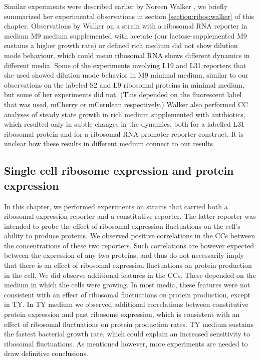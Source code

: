 Similar experiments were described earlier by Noreen Walker \cite{Walker2016t}, 
we briefly summarized her experimental observations in section \ref{section:ribos:walker} of this chapter.
%
Observations by Walker on a strain with a ribosomal RNA reporter in medium M9 medium supplemented with acetate (our lactose-supplemented M9 sustains a higher growth rate) or defined rich medium did not show dilution mode behaviour, which could mean ribosomal RNA shows different dynamics in different media.
%
Some of the experiments involving L19 and L31 reporters that she used showed dilution mode behavior in M9 minimal medium, similar to our observations on the labeled S2 and L9 ribosomal proteins in minimal medium, but some of her experiments did not. (This depended on the fluorescent label that was used, mCherry or mCerulean respectively.)
%
Walker also performed CC analyses of steady state growth in rich medium supplemented with antibiotics, which resulted only in subtle changes in the dynamics, both for a labelled L31 ribosomal protein and for a ribosomal RNA promoter reporter construct.
It is unclear how these results in different medium connect to our results.

\subsection{Single cell ribosome expression and protein expression}

In this chapter, we performed experiments on strains that carried both a ribosomal expression reporter and a constitutive reporter.
The latter reporter was intended to probe the effect of ribosomal expression fluctuations on the cell's ability to produce proteins.
%
We observed positive correlations in the CCs between the concentrations of these two reporters. 
%
Such correlations are however 
%
expected between the expression of any two proteins, 
and thus do not necessarily imply that there is an effect of ribosomal expression fluctuations on protein production in the cell.
%
We did observe additional features in the CCs. 
These depended on the medium in which the cells were growing.
%
In most media, these features were not consistent with an effect of ribosomal fluctuations on protein production,
except in TY.
%
In TY medium we observed additional correlations between constitutive protein expression and past ribosome expression,
which is consistent with an effect of ribosomal fluctuations on protein production rates.
%
TY medium sustains the fastest bacterial growth rate, 
which could explain an increased sensitivity to ribosomal fluctuations.
%
As mentioned however, more experiments are needed to draw definitive conclusions.



